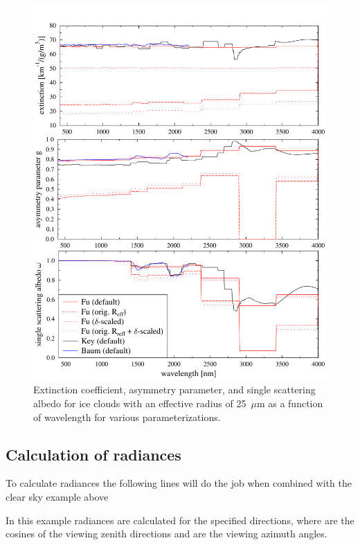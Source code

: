 \begin{figure}
  \centering
  \includegraphics[width=1.0\hsize]{./figs/fuyang.pdf}
  \caption{Extinction coefficient, asymmetry
    parameter, and single scattering albedo for ice clouds with an
    effective radius of 25~$\mu$m as a function of wavelength for
    various parameterizations.}
  \label{fig:fuyang}
\end{figure}

\subsection{Calculation of radiances}

To calculate radiances the following lines will do the job when
combined with the clear sky example above


In this example radiances are calculated for the specified directions,
where  are the cosines of the viewing zenith directions and
 are the viewing azimuth angles.

